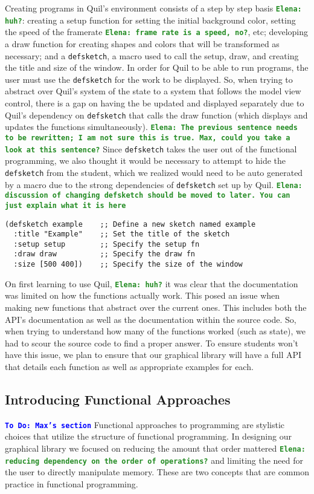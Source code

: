 \documentclass[12pt]{article}
\newcommand{\comment}[1]{{\bf \tt  {#1}}}
\newcommand{\emcomment}[1]{\textcolor{ForestGreen}{\comment{Elena: {#1}}}}
\newcommand{\todo}[1]{\textcolor{blue}{\comment{To Do: {#1}}}}
\begin{document}
Creating programs in Quil’s environment consists of a step by step basis \emcomment{huh?}: creating a setup function for setting the initial background color, setting the speed of the framerate \emcomment{frame rate is a speed, no?}, etc; developing a draw function for creating shapes and colors that will be transformed as necessary; and a \texttt{defsketch}, a macro used to call the setup, draw, and creating the title and size of the window. In order for Quil to be able to run programs, the user must use the \texttt{defsketch} for the work to be displayed. So, when trying to abstract over Quil’s system of the state to a system that follows the model view control,
there is a gap on having the be updated and displayed separately due to Quil’s dependency on \texttt{defsketch} that calls the draw function (which displays and updates the functions simultaneously). 
\emcomment{The previous sentence needs to be rewritten; I am not sure this is true. Max, could you take a look at this sentence?}
Since \texttt{defsketch} takes the user out of the functional programming, we also thought it would be necessary to attempt to hide the \texttt{defsketch} from the student, which we realized would need to be auto generated by a macro due to the strong dependencies of \texttt{defsketch} set up by Quil. \emcomment{discussion of changing defsketch should be moved to later. You can just explain what it is here}
\begin{verbatim} 
(defsketch example    ;; Define a new sketch named example
  :title "Example"    ;; Set the title of the sketch
  :setup setup        ;; Specify the setup fn
  :draw draw          ;; Specify the draw fn
  :size [500 400])    ;; Specify the size of the window
\end{verbatim}
On first learning to use Quil, \emcomment{huh?} it was clear that the documentation was limited on how the functions actually work. This posed an issue when making new functions that abstract over the current ones. This includes both the API’s documentation as well as the documentation within the source code. So, when trying to understand how many of the functions worked (such as state), we had to scour the source code to find a proper answer. To ensure students won’t have this issue, we plan to ensure that our graphical library will have a full API that details each function as well as appropriate examples for each.  


\subsection{Introducing Functional Approaches}\label{subsec:functional}
\todo{Max's section}
Functional approaches to programming are stylistic choices that utilize the structure of functional programming. In designing our graphical library we focused on reducing the amount that order mattered 
\emcomment{reducing dependency on the order of operations?}
and limiting the need for the user to directly manipulate memory. These are two concepts that are common practice in functional programming.
\end{document}
